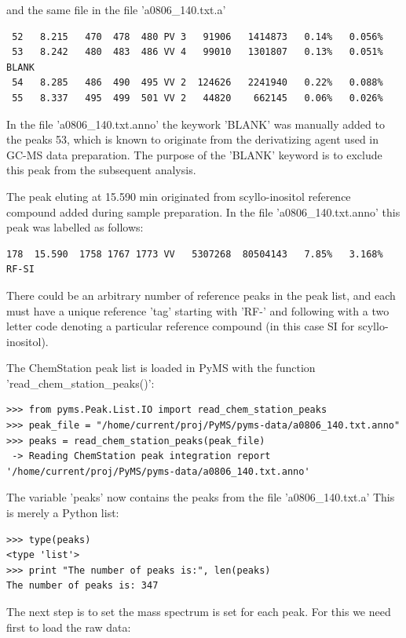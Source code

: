 \noindent
and the same file in the file 'a0806\_140.txt.a'

\begin{verbatim}
 52   8.215   470  478  480 PV 3   91906   1414873   0.14%   0.056%
 53   8.242   480  483  486 VV 4   99010   1301807   0.13%   0.051% BLANK
 54   8.285   486  490  495 VV 2  124626   2241940   0.22%   0.088%
 55   8.337   495  499  501 VV 2   44820    662145   0.06%   0.026%
\end{verbatim}

\noindent
In the file 'a0806\_140.txt.anno' the keywork 'BLANK' was manually added to
the peaks 53, which is known to originate from the derivatizing agent used
in GC-MS data preparation.  The purpose of the 'BLANK' keyword is to
exclude this peak from the subsequent analysis.

The peak eluting at 15.590 min originated from scyllo-inositol reference
compound added during sample preparation. In the file 'a0806\_140.txt.anno'
this peak was labelled as follows:

\begin{verbatim}
178  15.590  1758 1767 1773 VV   5307268  80504143   7.85%   3.168% RF-SI
\end{verbatim}

\noindent
There could be an arbitrary number of reference peaks in the peak list, and each
must have a unique reference 'tag' starting with 'RF-' and following with a two
letter code denoting a particular reference compound (in this case SI for
scyllo-inositol).

The ChemStation peak list is loaded in PyMS with the function
'read\_chem\_station\_peaks()':

\begin{verbatim}
>>> from pyms.Peak.List.IO import read_chem_station_peaks
>>> peak_file = "/home/current/proj/PyMS/pyms-data/a0806_140.txt.anno"
>>> peaks = read_chem_station_peaks(peak_file)
 -> Reading ChemStation peak integration report
'/home/current/proj/PyMS/pyms-data/a0806_140.txt.anno'
\end{verbatim}

\noindent
The variable 'peaks' now contains the peaks from the file 'a0806\_140.txt.a'
This is merely a Python list:

\begin{verbatim}
>>> type(peaks)
<type 'list'>
>>> print "The number of peaks is:", len(peaks)
The number of peaks is: 347
\end{verbatim}

The next step is to set the mass spectrum is set for each peak. For this we need
first to load the raw data:

